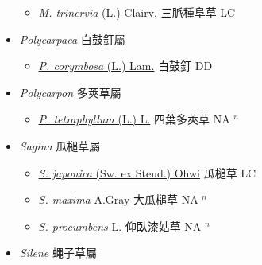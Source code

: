 \begin{itemize}
  \begin{itemize}
        \item[] \href{http://www.theplantlist.org/tpl1.1/search?q=Moehringia+trinervia}{\textit{M. trinervia} (L.) Clairv.}   三脈種阜草 LC
  \end{itemize}
 \item[] \textit{Polycarpaea} 白鼓釘屬
                    
  \begin{itemize}
        \item[] \href{http://www.theplantlist.org/tpl1.1/search?q=Polycarpaea+corymbosa}{\textit{P. corymbosa} (L.) Lam.}   白鼓釘 DD
  \end{itemize}
 \item[] \textit{Polycarpon} 多莢草屬
                    
  \begin{itemize}
        \item[] \href{http://www.theplantlist.org/tpl1.1/search?q=Polycarpon+tetraphyllum}{\textit{P. tetraphyllum} (L.) L.}   四葉多莢草 NA $^n$
  \end{itemize}
 \item[] \textit{Sagina} 瓜槌草屬
                    
  \begin{itemize}
        \item[] \href{http://www.theplantlist.org/tpl1.1/search?q=Sagina+japonica}{\textit{S. japonica} (Sw. ex Steud.) Ohwi}   瓜槌草 LC
        \item[] \href{http://www.theplantlist.org/tpl1.1/search?q=Sagina+maxima}{\textit{S. maxima} A.Gray}   大瓜槌草 NA $^n$
        \item[] \href{http://www.theplantlist.org/tpl1.1/search?q=Sagina+procumbens}{\textit{S. procumbens} L.}   仰臥漆姑草 NA $^n$
  \end{itemize}
 \item[] \textit{Silene} 蠅子草屬
                    

\end{itemize}
